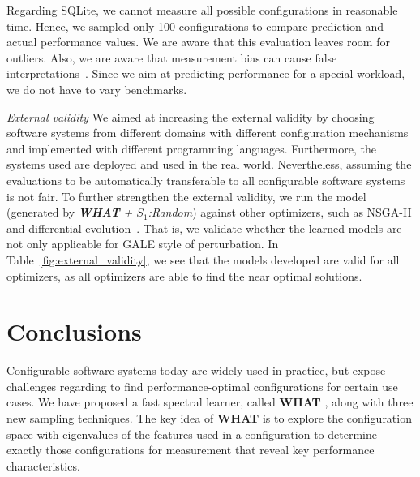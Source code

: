 \documentclass{newsig}
\newcommand{\what}{{\bf WHAT }}
\begin{document}
Regarding SQLite, we cannot measure all possible configurations in reasonable time. Hence, we sampled only 100 configurations to compare prediction and actual performance values. We are aware that this evaluation leaves room for outliers.
Also, we are aware that measurement bias can cause false interpretations~\cite{me12d}. Since we aim at predicting performance for a special workload, we do not have to vary benchmarks.



{\em External validity}  We aimed at increasing the external validity by choosing software systems from different domains with different configuration mechanisms and implemented with different programming languages. Furthermore, the systems used are deployed and used in the real world. Nevertheless, assuming the evaluations to be automatically transferable  to all configurable software systems is not fair. To further strengthen the external validity, we run the model (generated by \textit{\what + $S_1$:Random}) against other optimizers, such as NSGA-II and differential evolution~\cite{storn1997differential}. That is, we validate whether the learned models are not only applicable for GALE style of perturbation. In Table~\ref{fig:external_validity}, we see that the models developed are valid for all optimizers, as all optimizers are able to find the near optimal solutions.







\section{Conclusions}

Configurable software systems today are widely used in practice, but expose challenges regarding to find performance-optimal configurations for certain use cases. We have proposed a fast spectral learner, called \what,  along with three new sampling techniques. The key idea of \what is to explore the configuration space with eigenvalues of the features used in a configuration to determine exactly those configurations for measurement that reveal key performance characteristics. 
\end{document}
